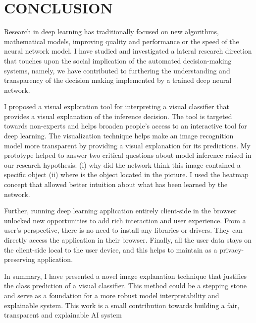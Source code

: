 %
%

\chapter{CONCLUSION}
\thispagestyle{empty}




Research in deep learning has traditionally focused on new algorithms, mathematical models, improving quality and performance or the speed of the neural network model. I have studied and investigated a lateral research direction that touches upon the social implication of the automated decision-making systems, namely, we have contributed to furthering the understanding and transparency of the decision making implemented by a trained deep neural network. 

I proposed a visual exploration tool for interpreting a visual classifier that provides a visual explanation of the inference decision. The tool is targeted towards non-experts and helps broaden people's access to an interactive tool for deep learning. The visualization technique helps make an image recognition model more transparent by providing a visual explanation for its predictions. My prototype helped to answer two critical questions about model inference raised in our research hypothesis: (i) why did the network think this image contained a specific object (ii) where is the object located in the picture. I used the heatmap concept that allowed better intuition about what has been learned by the network.

Further, running deep learning application entirely client-side in the browser unlocked new opportunities to add rich interaction and user experience. From a user's perspective, there is no need to install any libraries or drivers. They can directly access the application in their browser. Finally, all the user data stays on the client-side local to the user device, and this helps to maintain as a privacy-preserving application.

In summary, I have presented a novel image explanation technique that justifies the class prediction of a visual classifier. This method could be a  stepping stone and serve as a foundation for a more robust model interpretability and explainable system. This work is a small contribution towards building a fair, transparent and explainable AI system

